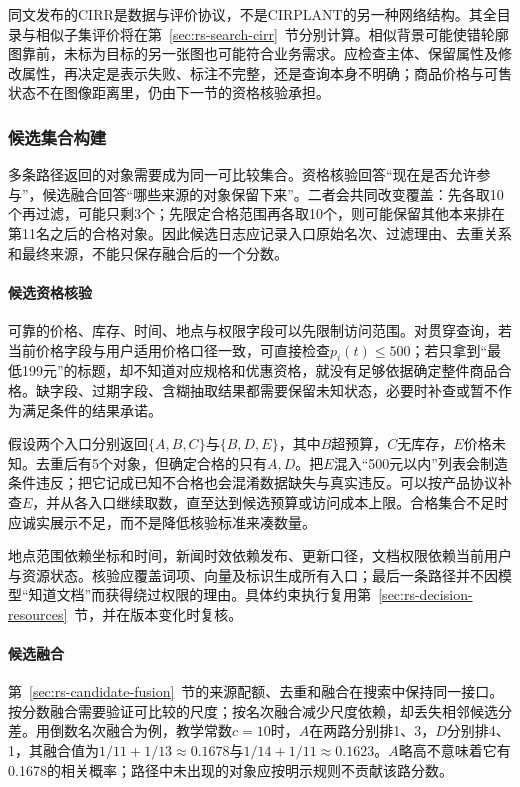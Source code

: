 同文发布的CIRR是数据与评价协议，不是CIRPLANT的另一种网络结构。其全目录与相似子集评价将在第~\ref{sec:rs-search-cirr}~节分别计算。相似背景可能使错轮廓图靠前，未标为目标的另一张图也可能符合业务需求。应检查主体、保留属性及修改属性，再决定是表示失败、标注不完整，还是查询本身不明确；商品价格与可售状态不在图像距离里，仍由下一节的资格核验承担。

\subsubsection{候选集合构建}
\label{sec:rs-search-candidate-set}

多条路径返回的对象需要成为同一可比较集合。资格核验回答“现在是否允许参与”，候选融合回答“哪些来源的对象保留下来”。二者会共同改变覆盖：先各取10个再过滤，可能只剩3个；先限定合格范围再各取10个，则可能保留其他本来排在第11名之后的合格对象。因此候选日志应记录入口原始名次、过滤理由、去重关系和最终来源，不能只保存融合后的一个分数。

\paragraph*{候选资格核验}
可靠的价格、库存、时间、地点与权限字段可以先限制访问范围。对贯穿查询，若当前价格字段与用户适用价格口径一致，可直接检查$p_i(t)\leq500$；若只拿到“最低199元”的标题，却不知道对应规格和优惠资格，就没有足够依据确定整件商品合格。缺字段、过期字段、含糊抽取结果都需要保留未知状态，必要时补查或暂不作为满足条件的结果承诺。

假设两个入口分别返回$\{A,B,C\}$与$\{B,D,E\}$，其中$B$超预算，$C$无库存，$E$价格未知。去重后有5个对象，但确定合格的只有$A,D$。把$E$混入“500元以内”列表会制造条件违反；把它记成已知不合格也会混淆数据缺失与真实违反。可以按产品协议补查$E$，并从各入口继续取数，直至达到候选预算或访问成本上限。合格集合不足时应诚实展示不足，而不是降低核验标准来凑数量。

地点范围依赖坐标和时间，新闻时效依赖发布、更新口径，文档权限依赖当前用户与资源状态。核验应覆盖词项、向量及标识生成所有入口；最后一条路径并不因模型“知道文档”而获得绕过权限的理由。具体约束执行复用第~\ref{sec:rs-decision-resources}~节，并在版本变化时复核。

\paragraph*{候选融合}
第~\ref{sec:rs-candidate-fusion}~节的来源配额、去重和融合在搜索中保持同一接口。按分数融合需要验证可比较的尺度；按名次融合减少尺度依赖，却丢失相邻候选分差。用倒数名次融合为例，教学常数$c=10$时，$A$在两路分别排1、3，$D$分别排4、1，其融合值为$1/11+1/13\approx0.1678$与$1/14+1/11\approx0.1623$。$A$略高不意味着它有0.1678的相关概率；路径中未出现的对象应按明示规则不贡献该路分数。

